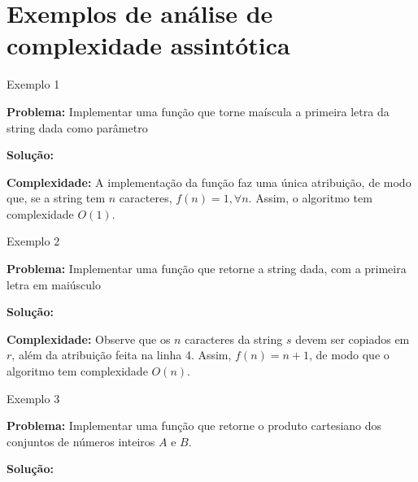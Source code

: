 \section{Exemplos de análise de complexidade assintótica}

\begin{frame}[fragile]{Exemplo 1}

	\textbf{Problema:} Implementar uma função que torne maíscula a primeira letra da string
        dada como parâmetro
	\vspace{0.1in}

	\textbf{Solução:} 
	\vspace{0.2in}

	{\bf Complexidade: } A implementação da função faz uma única atribuição, de modo que, se
        a string tem $n$ caracteres, $f(n) = 1, \forall n$. Assim, o algoritmo tem complexidade
        $O(1)$.

\end{frame} 

\begin{frame}[fragile]{Exemplo 2}

	\textbf{Problema:} Implementar uma função que retorne a string dada, com a primeira letra 
        em maiúsculo
	\vspace{0.1in}

	\textbf{Solução:} 
	\vspace{0.2in}

	{\bf Complexidade: } Observe que os $n$ caracteres da string $s$ devem ser copiados em $r$,
        além da atribuição feita na linha 4. Assim, $f(n) = n + 1$, de modo que o algoritmo tem 
        complexidade $O(n)$.

\end{frame} 


\begin{frame}[fragile]{Exemplo 3}

    {\bf Problema:} Implementar uma função que retorne o produto cartesiano dos conjuntos
        de números inteiros $A$ e $B$.
	\vspace{0.1in}

    {\bf Solução:} 
\end{frame} 

